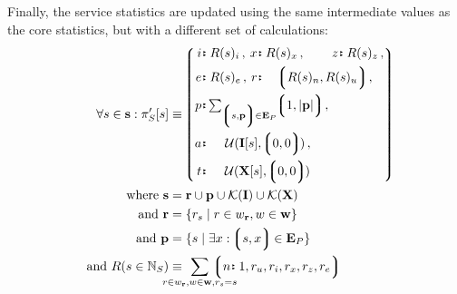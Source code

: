 Finally, the service statistics are updated using the same intermediate values as the core statistics, but with a different set of calculations:
\begin{align}
  \forall s \in \mathbf{s} : \pi'_S[s] &\equiv \tup{
    \begin{alignedat}{5}
      \is{i&}{R(s)_i}\,,\;
      \is{&x&}{R(s)_x}\,,\;
      \is{&z&}{R(s)_z}\,,\\
      \is{e&}{R(s)_e}\,,\;
      \is{&r&}{\span\span\tup{R(s)_n, R(s)_u}}\,,\;\\
      \is{p&}{\span\span \textstyle \sum_{\tup{s, \mathbf{p}} \in \mathbf{E}_P} \tup{1, |\mathbf{p}|}}\,,\;\\
      \is{a&}{\span\span \subifnone(\mathbf{I}[s], \tup{0, 0})}\,,\; \ \ \\
      \is{t&}{\span\span \subifnone(\mathbf{X}[s], \tup{0, 0})} \quad\\
    \end{alignedat}
  }\!\!\!\!\\
  \where \mathbf{s} &= \mathbf{r} \cup \mathbf{p} \cup \keys{\mathbf{I}} \cup \keys{\mathbf{X}}\\
  \also \mathbf{r} &= \{r_s \mid r \in w_\mathbf{r}, w \in \mathbf{w} \}\\
  \also \mathbf{p} &= \{s \mid \exists x: \tup{s, x} \in \mathbf{E}_P \}\\
  \also R(s \in \N_S) &\equiv \!\!\!\!\!\!\!\!\!\!\!
    \sum_{r \in w_\mathbf{r}, w \in \mathbf{w}, r_s = s}\!\!\!\!\!\!\!\!\!\!\!
    \tup{\is{n}{1}, r_u, r_i, r_x, r_z, r_e}
\end{align}